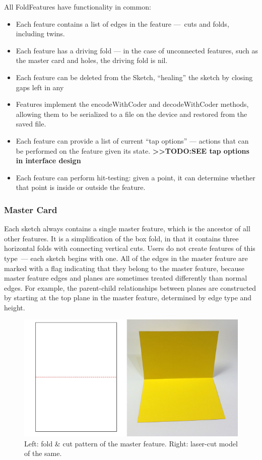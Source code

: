 All FoldFeatures have functionality in common:

\begin{itemize}
\itemsep1pt\parskip0pt
\item
  Each feature contains a list of edges in the feature ---~cuts and
  folds, including twins.
\item
  Each feature has a driving fold --- in the case of unconnected
  features, such as the master card and holes, the driving fold is nil.
\item
  Each feature can be deleted from the Sketch, ``healing'' the sketch by
  closing gaps left in any
\item
  Features implement the encodeWithCoder and decodeWithCoder methods,
  allowing them to be serialized to a file on the device and restored
  from the saved file.
\item
  Each feature can provide a list of current ``tap options'' --- actions
  that can be performed on the feature given its state.
  \textbf{\textgreater{}\textgreater{}TODO:SEE tap options in interface
  design}
\item
  Each feature can perform hit-testing: given a point, it can determine
  whether that point is inside or outside the feature.
\end{itemize}

\subsubsection{Master Card}\label{master-card}

Each sketch always contains a single master feature, which is the
ancestor of all other features. It is a simplification of the box fold,
in that it contains three horizontal folds with connecting vertical
cuts. Users do not create features of this type~--- each sketch begins
with one. All of the edges in the master feature are marked with a flag
indicating that they belong to the master feature, because master
feature edges and planes are sometimes treated differently than normal
edges. For example, the parent-child relationships between planes are
constructed by starting at the top plane in the master feature,
determined by edge type and height.

\begin{figure}[htbp]
\centering
\includegraphics{figures/33_UI_Interface_Data_Structures/mastercard.pdf}
\caption{Left: fold \& cut pattern of the master feature. Right:
laser-cut model of the same.}
\end{figure}

